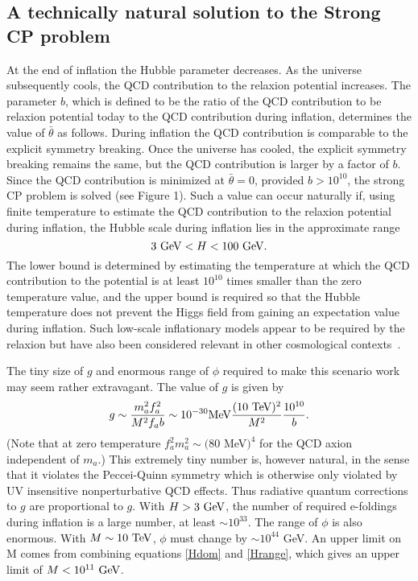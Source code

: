 \documentclass[12pt,aps,prd,showpacs,notitlepage,nofootinbib]{revtex4-1}
\newcommand{\gev}{\ {\rm GeV}}
\newcommand{\tev}{\ {\rm TeV}}
\newcommand{\beq}{\begin{equation}}
\newcommand{\eeq}{\end{equation}}
\begin{document}
\subsection{ A technically natural solution to the Strong CP problem}
At the end of inflation the Hubble parameter decreases. As the universe subsequently cools,   the QCD contribution to the relaxion potential increases.  The parameter $b$, which is defined to be the ratio of the QCD contribution to be relaxion potential today to the QCD contribution during inflation,  determines the value of $\bar\theta$ as follows. During inflation the QCD contribution is comparable to the explicit symmetry breaking. Once the universe has cooled, the explicit symmetry breaking remains the same, but the QCD contribution is larger by a factor of $b$. Since the QCD contribution is minimized at $\bar\theta=0$,  provided $b>10^{10}$, the strong CP problem is solved (see Figure 1). Such a value can occur naturally if, using finite temperature to estimate the QCD contribution to the relaxion potential during inflation, the Hubble scale during inflation lies in the approximate range 
 \beq \label{Hrange} 3 \gev < H<100 \gev.
\eeq  
The lower bound is determined by estimating the temperature at which the  QCD contribution to the potential is at least $10^{10}$ times smaller than the zero temperature value, and the upper bound is required so that the Hubble temperature does not prevent the Higgs field from gaining an expectation value during inflation. Such low-scale inflationary models appear to be required by the relaxion but have also been considered relevant in other cosmological contexts~\cite{Moroi:1993mb,Kawasaki:1994af,Bolz:2000fu,German:2001tz,Choi:2016luu,Evans:2017bjs}. 
  
  The tiny size of $g$ and enormous range of $\phi$ required to make this scenario work may seem rather extravagant. The value of $g$ is given by
\beq
g\sim \frac{m_a^2 f^2_a}{ M^2 f_a b}\sim 10^{-30} {\rm MeV} \frac{(10 \tev)^2}{M^2}\frac{10^{10}}{b}.
\eeq
(Note that at zero temperature $f_a^2 m_a^2 \sim (80$ MeV$)^4$ for the QCD axion independent of $m_a$.) This extremely tiny number is, however natural, in the sense that it violates the Peccei-Quinn symmetry which is otherwise only violated by UV insensitive nonperturbative QCD effects. Thus radiative quantum corrections to $g$ are proportional to $g$.  With $H> 3 \gev$, the number of required e-foldings during inflation is a large number, at least $\sim 10^{33}$. The range of $\phi$ is also enormous. With $M\sim 10 \tev$, $\phi$ must change by $\sim 10^{44}$ GeV. An upper limit on M comes from combining equations \ref{Hdom} and \ref{Hrange}, which gives an upper limit of $M < 10^{11} \gev$.
\end{document}
